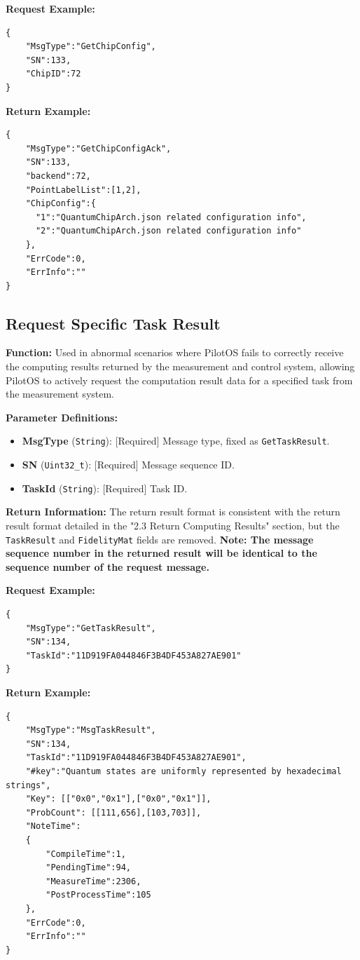 \documentclass[12pt, a4paper]{article}
\begin{document}
\noindent \textbf{Request Example:}
\begin{lstlisting}
{
    "MsgType":"GetChipConfig",
    "SN":133,
    "ChipID":72
}
\end{lstlisting}

\noindent \textbf{Return Example:}
\begin{lstlisting}
{
    "MsgType":"GetChipConfigAck",
    "SN":133,
    "backend":72,
    "PointLabelList":[1,2],
    "ChipConfig":{
      "1":"QuantumChipArch.json related configuration info",
      "2":"QuantumChipArch.json related configuration info"
    },
    "ErrCode":0,
    "ErrInfo":""
}
\end{lstlisting}

\subsection{Request Specific Task Result}

\textbf{Function:} Used in abnormal scenarios where PilotOS fails to correctly receive the computing results returned by the measurement and control system, allowing PilotOS to actively request the computation result data for a specified task from the measurement system.

\textbf{Parameter Definitions:}
\begin{itemize}
    \item \textbf{MsgType} (\texttt{String}): [Required] Message type, fixed as \texttt{GetTaskResult}.
    \item \textbf{SN} (\texttt{Uint32\_t}): [Required] Message sequence ID.
    \item \textbf{TaskId} (\texttt{String}): [Required] Task ID.
\end{itemize}

\textbf{Return Information:}
The return result format is consistent with the return result format detailed in the "2.3 Return Computing Results" section, but the \texttt{TaskResult} and \texttt{FidelityMat} fields are removed. 
\textbf{Note: The message sequence number in the returned result will be identical to the sequence number of the request message.}

\noindent \textbf{Request Example:}
\begin{lstlisting}
{
    "MsgType":"GetTaskResult",
    "SN":134,
    "TaskId":"11D919FA044846F3B4DF453A827AE901"
}
\end{lstlisting}

\noindent \textbf{Return Example:}
\begin{lstlisting}
{
    "MsgType":"MsgTaskResult",
    "SN":134,
    "TaskId":"11D919FA044846F3B4DF453A827AE901",
    "#key":"Quantum states are uniformly represented by hexadecimal strings",
    "Key": [["0x0","0x1"],["0x0","0x1"]],
    "ProbCount": [[111,656],[103,703]],
    "NoteTime":
    {
        "CompileTime":1,
        "PendingTime":94,
        "MeasureTime":2306,
        "PostProcessTime":105
    },
    "ErrCode":0,
    "ErrInfo":""
}
\end{lstlisting}
\end{document}
